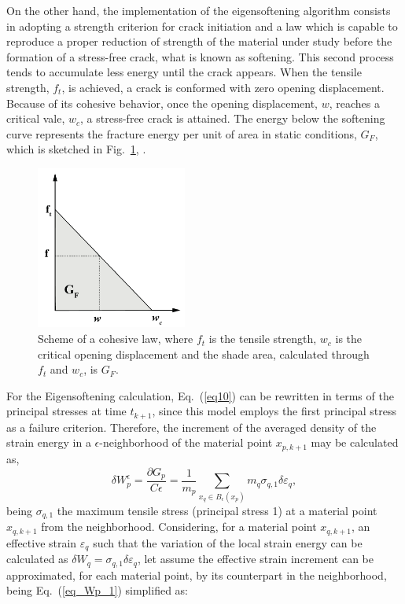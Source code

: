 \documentclass[applsci,journal,article,submit,moreauthors,pdftex]{Definitions/mdpi}
\begin{document}
On the other hand, the implementation of the eigensoftening algorithm consists in adopting a strength criterion for crack initiation and a law which is capable to reproduce a proper reduction of strength of the material under study before the formation of a stress-free crack, what is known as softening. This second process tends to accumulate less energy until the crack appears. When the tensile strength, $f_t$, is achieved, a crack is conformed with zero opening displacement. Because of its cohesive behavior, once the opening displacement, $w$, reaches a critical vale, $w_c$, a stress-free crack is attained. The energy below the softening curve represents the fracture energy per unit of area in static conditions, $G_F$, which is sketched in Fig.~\ref{fig_GF}, \cite{Navas2018a}.
\begin{figure}
\centering
\includegraphics[width=0.44\textwidth]{Figs/GF.pdf}
\caption{Scheme of a cohesive law, where $f_t$ is the tensile strength, $w_c$  is the critical opening displacement and the shade area, calculated through  $f_t$ and $w_c$, is $G_F$.}
\label{fig_GF}
\end{figure}
For the Eigensoftening calculation, Eq.~(\ref{eq10}) can be rewritten in terms of the principal stresses at time $t_{k+1}$, since this model employs the first principal stress as a failure criterion. Therefore, the increment of the averaged density of the strain energy in a $\epsilon$-neighborhood of the material point $x_{p, k+1}$ may be calculated as,
\begin{equation}\label{eq_Wp_1}
\delta W^\epsilon_{p} = \frac{\partial G_{p}}{C\epsilon} = \frac{1}{m_{p}}\sum_{x_{q}\in B_\epsilon (x_{p})} m_{q} \sigma_{q,1} \delta \varepsilon_q,
\end{equation}
being $\sigma_{q, 1}$ the maximum tensile stress (principal stress 1) at a material point $x_{q, k+1}$ from the neighborhood. Considering, for a material point $x_{q, k+1}$, an effective strain $\varepsilon_q$ such that the variation of the local strain energy can be calculated as $\delta W_q = \sigma_{q, 1}\delta \varepsilon_q$, let assume the effective strain increment can be approximated, for each material point, by its counterpart in the neighborhood, being Eq.~(\ref{eq_Wp_1}) simplified as:
\end{document}
